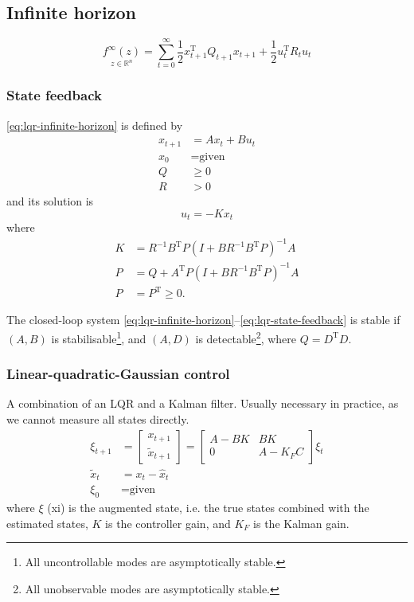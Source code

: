 \documentclass[a4paper, 12pt]{article}
\theoremstyle{definition}
\newcommand{\T}{^{\scriptscriptstyle \text{T}}}
\begin{document}
\subsection{Infinite horizon}
\begin{equation}\label{eq:lqr-infinite-horizon}
	\underset
		{z \in \mathbb{R}^n}
		{f^\infty(z)}
	=
	\sum_{t=0}^{\infty}
		\frac{1}{2} x_{t+1}\T Q_{t+1} x_{t+1}
		+
		\frac{1}{2} u_t\T R_t u_t
\end{equation}

\subsubsection{State feedback}
\eqref{eq:lqr-infinite-horizon} is defined by
\begin{align}\label{eq:lqr-state-feedback}
	x_{t+1} &= A x_t + B u_t \\
	x_0     &= \text{given}  \\
	Q       &\geq 0 \\
	R       &>    0
\end{align}
and its solution is
\begin{equation}
	u_t = - K x_t
\end{equation}
where
\begin{align}
	K &= R^{-1} B\T P \left( I + B R^{-1} B\T P \right)^{-1} A \\
	P &= Q + A\T P \left( I + B R^{-1} B\T P \right)^{-1} A    \\
	P &= P\T \geq 0
	.
\end{align}

The closed-loop system \eqref{eq:lqr-infinite-horizon}--\eqref{eq:lqr-state-feedback} is stable if \( (A, B) \) is stabilisable\footnote{All uncontrollable modes are asymptotically stable.}, and \( (A, D) \) is detectable\footnote{All unobservable modes are asymptotically stable.}, where \( Q = D\T D \).

\subsubsection{Linear-quadratic-Gaussian control}
A combination of an LQR and a Kalman filter. Usually necessary in practice, as we cannot measure all states directly.
\begin{align}
	\xi_{t+1} &=
		\begin{bmatrix}
			x_{t+1} \\
			\widetilde{x}_{t+1}
		\end{bmatrix}
		=
		\begin{bmatrix}
			A - B K & B K \\
			0       & A - K_F C
		\end{bmatrix}
		\xi_t
		\\
	\widetilde{x}_t &= x_t - \hat{x}_t \\
	\xi_0 &= \text{given}
\end{align}
where \( \xi \) (xi) is the augmented state, i.e. the true states combined with the estimated states, \(K\) is the controller gain, and \(K_F\) is the Kalman gain.
\end{document}
